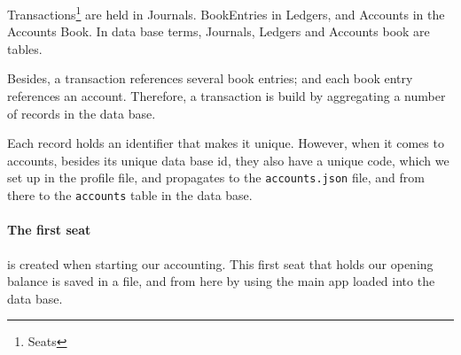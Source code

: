 \documentclass[12pt, a4paper]{article}
\begin{document}
 Transactions\footnote{Seats} are held in Journals. BookEntries  in Ledgers, and Accounts in  the Accounts Book. In data base terms, Journals, Ledgers and Accounts book are tables.  
 
 Besides, a transaction references several book entries; and each book entry references an account.
 Therefore, a transaction is build by aggregating a number of  records in the data base.
 
 Each record holds an identifier that makes it unique. However, when it comes to accounts, besides its unique data base id, they also have a unique code, which we set up in the profile file, and propagates to the \verb!accounts.json! file, and from there to the \verb!accounts! table in the data base.
 
 \paragraph{The first seat} is created when starting our accounting. This first seat that holds our opening balance is saved in a file, and from here by using the main app loaded into the data base. 
  \begin{figure}[h]
 \centering
 \end{figure}
\end{document}
